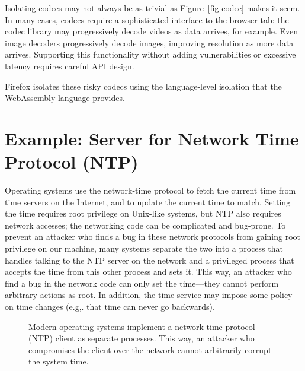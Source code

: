 \documentclass[
  letterpaper,
]{scrbook}
\theoremstyle{definition}
\theoremstyle{plain}
\theoremstyle{plain}
\theoremstyle{remark}
\begin{document}
Isolating codecs may not always be as trivial as Figure~\ref{fig-codec}
makes it seem. In many cases, codecs require a sophisticated interface
to the browser tab: the codec library may progressively decode videos as
data arrives, for example. Even image decoders progressively decode
images, improving resolution as more data arrives. Supporting this
functionality without adding vulnerabilities or excessive latency
requires careful API design.

Firefox isolates these risky codecs using the language-level isolation
that the WebAssembly language provides.

\section{Example: Server for Network Time Protocol
(NTP)}\label{example-server-for-network-time-protocol-ntp}

Operating systems use the network-time protocol to fetch the current
time from time servers on the Internet, and to update the current time
to match. Setting the time requires root privilege on Unix-like systems,
but NTP also requires network accesses; the networking code can be
complicated and bug-prone. To prevent an attacker who finds a bug in
these network protocols from gaining root privilege on our machine, many
systems separate the two into a process that handles talking to the NTP
server on the network and a privileged process that accepts the time
from this other process and sets it. This way, an attacker who find a
bug in the network code can only set the time---they cannot perform
arbitrary actions as root. In addition, the time service may impose some
policy on time changes (e.g,. that time can never go backwards).

\begin{figure}


\caption{\label{fig-ntp}Modern operating systems implement a
network-time protocol (NTP) client as separate processes. This way, an
attacker who compromises the client over the network cannot arbitrarily
corrupt the system time.}

\end{figure}%
\end{document}
